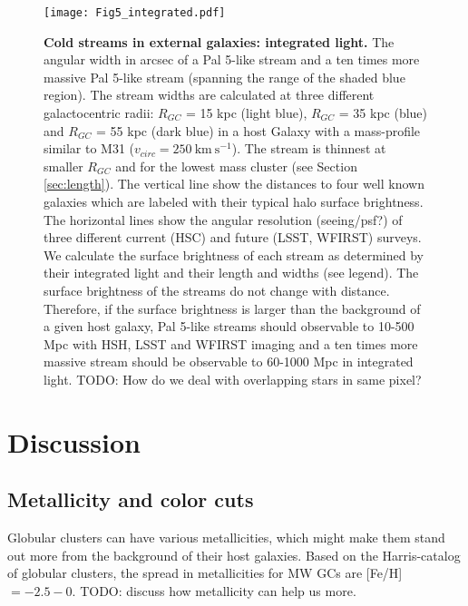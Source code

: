 \documentclass[twocolumn]{aastex62}
\newcommand{\kms}{\ensuremath{\textrm{km}~\textrm{s}^{-1}}}
\newcommand{\todo}[1]{{\color{red} TODO: #1}}
\begin{document}
\begin{figure}
\centerline{\texttt{[image: Fig5\_integrated.pdf]}}
\caption{{\bf Cold streams in external galaxies: integrated light.} The angular width in arcsec of a Pal 5-like stream and a ten times more massive Pal 5-like stream (spanning the range of the shaded blue region). The stream widths are calculated at three different galactocentric radii: $R_{GC}$ = 15  kpc (light blue), $R_{GC}$ = 35 kpc (blue) and $R_{GC}$ = 55 kpc (dark blue) in a host Galaxy with a mass-profile similar to M31 ($v_{circ} = 250 ~\kms$). The stream is thinnest at smaller $R_{GC}$ and for the lowest mass cluster (see Section \ref{sec:length}). The vertical line show the distances to four well known galaxies which are labeled with their typical halo surface brightness. The horizontal lines show the angular resolution (seeing/psf?) of three different current (HSC) and future (LSST, WFIRST) surveys. We calculate the surface brightness of each stream as determined by their integrated light and their length and widths (see legend). The surface brightness of the streams do not change with distance. Therefore, if the surface brightness is larger than the background of a given host galaxy,  Pal 5-like streams should observable to 10-500 Mpc with HSH, LSST and WFIRST imaging and a ten times more massive stream should be observable to 60-1000 Mpc in integrated light. \todo{How do we deal with overlapping stars in same pixel?} }
\label{fig:int}
\end{figure}


\section{Discussion}
\label{sec:discussion}

\subsection{Metallicity and color cuts}
\label{sec:color}
Globular clusters can have various metallicities, which might make them stand out more from the background of their host galaxies. 
Based on the Harris-catalog of globular clusters, the spread in metallicities for MW GCs are [Fe/H]$ = -2.5 - 0$. \todo{discuss how metallicity can help us more}.
\end{document}
